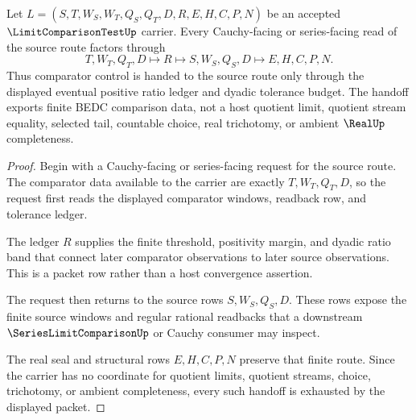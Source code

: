 \begin{theorem}\label{thm:limit-comparison-test-cauchy-handoff}
Let $L=(S,T,W_S,W_T,Q_S,Q_T,D,R,E,H,C,P,N)$ be an accepted $\LimitComparisonTestUp$ carrier. Every Cauchy-facing or series-facing read of the source route factors through
$$
T,W_T,Q_T,D \longmapsto R \longmapsto S,W_S,Q_S,D \longmapsto E,H,C,P,N .
$$
Thus comparator control is handed to the source route only through the displayed eventual positive ratio ledger and dyadic tolerance budget. The handoff exports finite BEDC comparison data, not a host quotient limit, quotient stream equality, selected tail, countable choice, real trichotomy, or ambient $\RealUp$ completeness.
\end{theorem}
\begin{proof}
Begin with a Cauchy-facing or series-facing request for the source route. The comparator data available to the carrier are exactly $T,W_T,Q_T,D$, so the request first reads the displayed comparator windows, readback row, and tolerance ledger.

The ledger $R$ supplies the finite threshold, positivity margin, and dyadic ratio band that connect later comparator observations to later source observations. This is a packet row rather than a host convergence assertion.

The request then returns to the source rows $S,W_S,Q_S,D$. These rows expose the finite source windows and regular rational readbacks that a downstream $\SeriesLimitComparisonUp$ or Cauchy consumer may inspect.

The real seal and structural rows $E,H,C,P,N$ preserve that finite route. Since the carrier has no coordinate for quotient limits, quotient streams, choice, trichotomy, or ambient completeness, every such handoff is exhausted by the displayed packet.
\end{proof}


